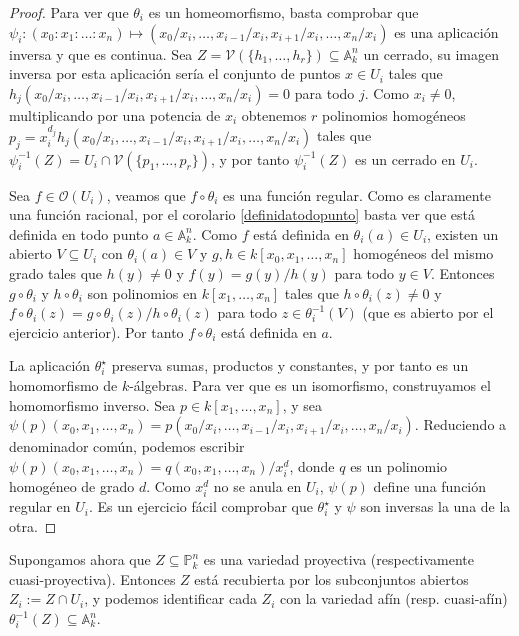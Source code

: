 \documentclass[a4paper,10pt]{book}
\newcommand{\AAA}{\mathbb A}
\newcommand{\PP}{\mathbb P}
\newcommand{\Ank}{\AAA^n_k}
\newcommand{\Pnk}{\PP^n_k}
\newcommand{\VV}{{\mathcal V}}
\newcommand{\OO}{{\mathcal O}}
\begin{document}
\begin{proof}
 Para ver que $\theta_i$ es un homeomorfismo, basta comprobar que $\psi_i:(x_0:x_1:\ldots:x_n)\mapsto (x_0/x_i,\ldots,x_{i-1}/x_i,x_{i+1}/x_i,\ldots,x_n/x_i)$ es una aplicación inversa y que es continua. Sea $Z=\VV(\{h_1,\ldots,h_r\})\subseteq\Ank$ un cerrado, su imagen inversa por esta aplicación sería el conjunto de puntos $x\in U_i$ tales que $h_j(x_0/x_i,\ldots,x_{i-1}/x_i,x_{i+1}/x_i,\ldots,x_n/x_i)=0$ para todo $j$. Como $x_i\neq 0$, multiplicando por una potencia de $x_i$ obtenemos $r$ polinomios homogéneos $p_j=x_i^{d_j}h_j(x_0/x_i,\ldots,x_{i-1}/x_i,x_{i+1}/x_i,\ldots,x_n/x_i)$ tales que $\psi_i^{-1}(Z)=U_i\cap \VV(\{p_1,\ldots,p_r\})$, y por tanto $\psi_i^{-1}(Z)$ es un cerrado en $U_i$.

 Sea $f\in\OO(U_i)$, veamos que $f\circ\theta_i$ es una función regular. Como es claramente una función racional, por el corolario \ref{definidatodopunto} basta ver que está definida en todo punto $a\in\Ank$. Como $f$ está definida en $\theta_i(a)\in U_i$, existen un abierto $V\subseteq U_i$ con $\theta_i(a)\in V$ y $g,h\in k[x_0,x_1,\ldots,x_n]$ homogéneos del mismo grado tales que $h(y)\neq 0$ y $f(y)=g(y)/h(y)$ para todo $y\in V$. Entonces $g\circ\theta_i$ y $h\circ\theta_i$ son polinomios en $k[x_1,\ldots,x_n]$ tales que $h\circ\theta_i(z)\neq 0$ y $f\circ\theta_i(z)=g\circ\theta_i(z)/h\circ\theta_i(z)$ para todo $z\in\theta_i^{-1}(V)$ (que es abierto por el ejercicio anterior). Por tanto $f\circ\theta_i$ está definida en $a$.

La aplicación $\theta_i^\star$ preserva sumas, productos y constantes, y por tanto es un homomorfismo de $k$-álgebras. Para ver que es un isomorfismo, construyamos el homomorfismo inverso. Sea $p\in k[x_1,\ldots,x_n]$, y sea $\psi(p)(x_0,x_1,\ldots,x_n)=p(x_0/x_i,\ldots,x_{i-1}/x_i,x_{i+1}/x_i,\ldots,x_n/x_i)$. Reduciendo a denominador común, podemos escribir $\psi(p)(x_0,x_1,\ldots,x_n)=q(x_0,x_1,\ldots,x_n)/x^d_i$, donde $q$ es un polinomio homogéneo de grado $d$. Como $x^d_i$ no se anula en $U_i$, $\psi(p)$ define una función regular en $U_i$. Es un ejercicio fácil comprobar que $\theta_i^\star$ y $\psi$ son inversas la una de la otra.
\end{proof}

Supongamos ahora que $Z\subseteq\Pnk$ es una variedad proyectiva (respectivamente cuasi-proyectiva). Entonces $Z$ está recubierta por los subconjuntos abiertos $Z_i:=Z\cap U_i$, y podemos identificar cada $Z_i$ con la variedad afín (resp. cuasi-afín) $\theta_i^{-1}(Z)\subseteq\Ank$. 
\end{document}
